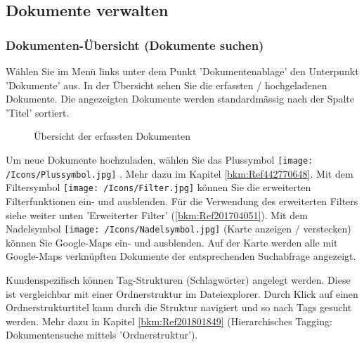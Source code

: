 \pagebreak
\subsection{Dokumente verwalten}
\label{bkm:Ref442273482}

\subsubsection{Dokumenten-Übersicht (Dokumente suchen)}
\label{bkm:Ref443047823}

Wählen Sie im Menü links unter dem Punkt 'Dokumentenablage' den Unterpunkt 'Dokumente' aus. In der Übersicht sehen Sie die erfassten / hochgeladenen Dokumente. Die angezeigten Dokumente werden standardmässig nach der Spalte 'Titel' sortiert. 

\begin{figure}[H]
\caption{Übersicht der erfassten Dokumenten}
\end{figure}

Um neue Dokumente hochzuladen, wählen Sie das Plussymbol \texttt{[image: /Icons/Plussymbol.jpg]} . Mehr dazu im Kapitel \ref{bkm:Ref442770648}. Mit dem Filtersymbol \texttt{[image: /Icons/Filter.jpg]}  können Sie die erweiterten Filterfunktionen ein- und ausblenden. Für die Verwendung des erweiterten Filters siehe weiter unten 'Erweiterter Filter' (\ref{bkm:Ref201704051}). Mit dem Nadelsymbol \texttt{[image: /Icons/Nadelsymbol.jpg]} (Karte anzeigen / verstecken) können Sie Google-Maps ein- und ausblenden. Auf der Karte werden alle mit Google-Maps verknüpften Dokumente der entsprechenden Suchabfrage angezeigt.\newline

Kundenspezifisch können Tag-Strukturen (Schlagwörter) angelegt werden. Diese ist vergleichbar mit einer Ordnerstruktur im Dateiexplorer. Durch Klick auf einen Ordnerstrukturtitel  kann durch die Struktur navigiert und so nach Tags gesucht werden. Mehr dazu in Kapitel \ref{bkm:Ref201801849} (Hierarchisches Tagging: Dokumentensuche mittels 'Ordnerstruktur'). \newline

